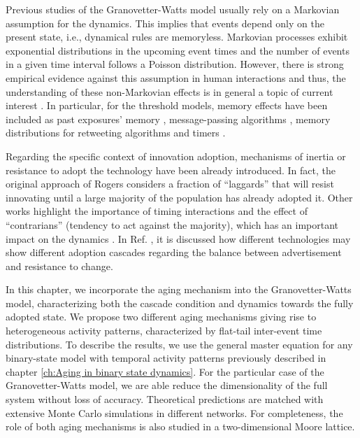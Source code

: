 Previous studies of the Granovetter-Watts model usually rely on a Markovian assumption for the dynamics. This implies that events depend only on the present state, i.e., dynamical rules are memoryless. Markovian processes exhibit exponential distributions in the upcoming event times and the number of events in a given time interval follows a Poisson distribution. However, there is strong empirical evidence against this assumption in human interactions and thus, the understanding of these non-Markovian effects is in general a topic of current interest \cite{van-mieghem-2013,starnini-2017,peralta-2020C,peralta-2020A}. In particular, for the threshold models, memory effects have been included as past exposures' memory \cite{dodds-2004}, message-passing algorithms \cite{shrestha-2014}, memory distributions for retweeting algorithms \cite{gleeson-2016} and timers \cite{oh-2018}.

Regarding the specific context of innovation adoption, mechanisms of inertia or resistance to adopt the technology have been already introduced. In fact, the original approach of Rogers \cite{rogers2014} considers a fraction of ``laggards'' that will resist innovating until a large majority of the population has already adopted it. Other works highlight the importance of timing interactions \cite{bass1969} and the effect of ``contrarians'' (tendency to act against the majority), which has an important impact on the dynamics \cite{galam-2008,goncalves-2012}. In Ref. \cite{goncalves-2012}, it is discussed how different technologies may show different adoption cascades regarding the balance between advertisement and resistance to change.

In this chapter, we incorporate the aging mechanism into the Granovetter-Watts model, characterizing both the cascade condition and dynamics towards the fully adopted state. We propose two different aging mechanisms giving rise to heterogeneous activity patterns, characterized by flat-tail inter-event time distributions. To describe the results, we use the general master equation for any binary-state model with temporal activity patterns previously described in chapter \ref{ch:Aging in binary state dynamics}. For the particular case of the Granovetter-Watts model, we are able reduce the dimensionality of the full system without loss of accuracy. Theoretical predictions are matched with extensive Monte Carlo simulations in different networks. For completeness, the role of both aging mechanisms is also studied in a two-dimensional Moore lattice.

